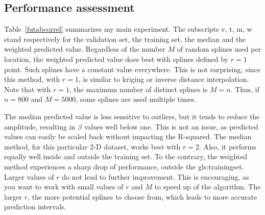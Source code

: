 \documentclass[oneside,10pt]{book}
\begin{document}
\subsection{Performance assessment}\label{fpe1s}

Table~\ref{futabcorrel} summarizes my main experiment. The subscripts v, t, m, w stand respectively for the validation set, the training set, the median and the weighted predicted value. Regardless of the number $M$ of random splines used per location, the weighted predicted value does best with splines defined by $r=1$ point. Such splines have a constant value everywhere. This is not surprising, since this method, with $r=1$, is similar to kriging or inverse distance interpolation. Note that with $r=1$, the maximum number of distinct splines is $M=n$. Thus, if $n=800$ and $M=5000$, some splines are used multiple times.

The median predicted value is less sensitive to outliers, but it tends to reduce the amplitude, resulting in $\beta$ values well below one. This is not an issue, as predicted values can easily be scaled back without impacting the R-squared. The median method, for this particular 2-D dataset, works best with $r=2$. Also, it performs equally well inside and outside the training set. To the contrary, the weighted method experiences a sharp drop of performance, outside the \gls{gls:trainingset}.
Larger values of $r$ do not lead to further improvement. This is encouraging, as you want to work with small values of $r$ and $M$ to speed up of the algorithm.  The larger $r$, the
more potential splines to choose from, which leads to more accurate prediction intervals.
\end{document}
